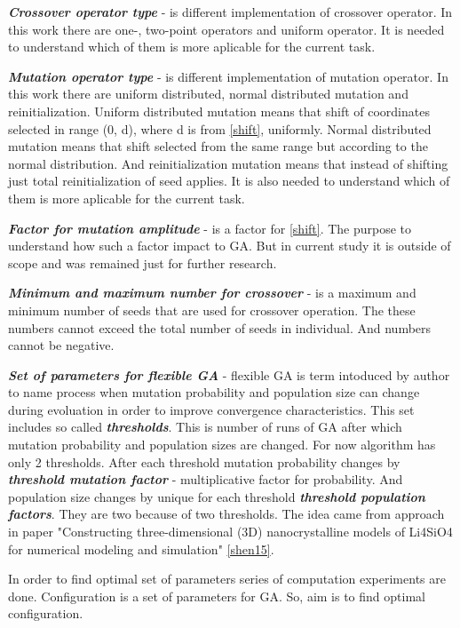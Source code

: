 \documentclass[12pt]{report}
\begin{document}
\textit{\textbf{Crossover operator type}} - is different implementation of crossover operator. In this work there are one-, two-point operators and uniform operator. It is needed to understand which of them is more aplicable for the current task.

\textit{\textbf{Mutation operator type}} - is different implementation of mutation operator. In this work there are uniform distributed, normal distributed mutation and reinitialization. Uniform distributed mutation means that shift of coordinates selected in range (0, d), where d is from \ref{shift}, uniformly. Normal distributed mutation means that shift selected from the same range but according to the normal distribution. And reinitialization mutation means that instead of shifting just total reinitialization of seed applies. It is also needed to understand which of them is more aplicable for the current task.

\textit{\textbf{Factor for mutation amplitude}} - is a factor for \ref{shift}. The purpose to understand how such a factor impact to GA. But in current study it is outside of scope and was remained just for further research.

\textit{\textbf{Minimum and maximum number for crossover}} - is a maximum and minimum number of seeds that are used for crossover operation. The these numbers cannot exceed the total number of seeds in individual. And numbers cannot be negative.

\textit{\textbf{Set of parameters for flexible GA}} - flexible GA is term intoduced by author to name process when mutation probability and population size can change during evoluation in order to improve convergence characteristics. This set includes so called \textit{\textbf{thresholds}}. This is number of runs of GA after which mutation probability and population sizes are changed. For now algorithm has only 2 thresholds. After each threshold mutation probability changes by \textit{\textbf{threshold mutation factor}} - multiplicative factor for probability. And population size changes by unique for each threshold \textit{\textbf{threshold population factors}}. They are two because of two thresholds. The idea came from approach in paper "Constructing three-dimensional (3D) nanocrystalline models of Li4SiO4 for numerical modeling and simulation" \ref{shen15}.

In order to find optimal set of parameters series of computation experiments are done. Configuration is a set of parameters for GA. So, aim is to find optimal configuration. 
\end{document}
